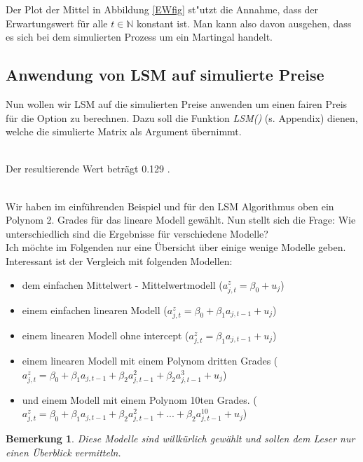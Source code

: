 \documentclass[10pt,a4paper]{article}\usepackage[]{graphicx}\usepackage[]{color}
\newtheorem{mybem}{Bemerkung}
\begin{document}
Der Plot der Mittel in Abbildung \ref{EWfig} st"utzt die Annahme, dass der Erwartungswert für alle $t \in \mathbb{N}$ konstant ist. Man kann also davon ausgehen, dass es sich bei dem simulierten Prozess um ein Martingal handelt. 

\subsection{Anwendung von LSM auf simulierte Preise}

Nun wollen wir LSM auf die simulierten Preise anwenden um einen fairen Preis für die Option zu berechnen. Dazu soll die Funktion \textit{LSM()} (s. Appendix) dienen, welche die simulierte Matrix als Argument übernimmt. 


\ \\
Der resultierende Wert beträgt  
0.129
.

\ \\
Wir haben im einführenden Beispiel und für den LSM Algorithmus oben ein Polynom 2. Grades für das lineare Modell gewählt. Nun stellt sich die Frage: Wie unterschiedlich sind die Ergebnisse für verschiedene Modelle?\\
Ich möchte im Folgenden nur eine Übersicht über einige wenige Modelle geben. Interessant ist der Vergleich mit folgenden Modellen:

\begin{itemize}
\item dem einfachen Mittelwert - Mittelwertmodell ($ a_{j,t}^z=\beta_0+u_j $)
\item einem einfachen linearen Modell ($ a_{j,t}^z=\beta_0+\beta_1 a_{j,t-1}+u_j $)
\item einem linearen Modell ohne intercept ($ a_{j,t}^z=\beta_1 a_{j,t-1}+u_j $)
\item einem linearen Modell mit einem Polynom dritten Grades ($ a_{j,t}^z=\beta_0+\beta_1 a_{j,t-1} + \beta_2 a_{j,t-1}^2 + \beta_2 a_{j,t-1}^3  +u_j $)
\item und einem Modell mit einem Polynom 10ten Grades. ($ a_{j,t}^z=\beta_0+\beta_1 a_{j,t-1} + \beta_2 a_{j,t-1}^2 + ... + \beta_2 a_{j,t-1}^10  +u_j $)
\end{itemize}

\begin{mybem}
Diese Modelle sind willkürlich gewählt und sollen dem Leser nur einen Überblick vermitteln.
\end{mybem}
\end{document}

